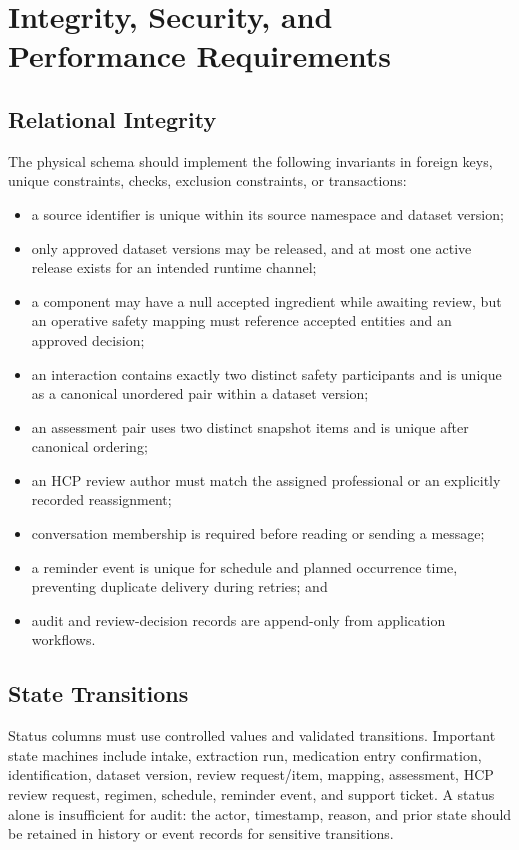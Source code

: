 \section{Integrity, Security, and Performance Requirements}

\subsection{Relational Integrity}

The physical schema should implement the following invariants in foreign keys, unique constraints, checks, exclusion constraints, or transactions:
\begin{itemize}
  \item a source identifier is unique within its source namespace and dataset version;
  \item only approved dataset versions may be released, and at most one active release exists for an intended runtime channel;
  \item a component may have a null accepted ingredient while awaiting review, but an operative safety mapping must reference accepted entities and an approved decision;
  \item an interaction contains exactly two distinct safety participants and is unique as a canonical unordered pair within a dataset version;
  \item an assessment pair uses two distinct snapshot items and is unique after canonical ordering;
  \item an HCP review author must match the assigned professional or an explicitly recorded reassignment;
  \item conversation membership is required before reading or sending a message;
  \item a reminder event is unique for schedule and planned occurrence time, preventing duplicate delivery during retries; and
  \item audit and review-decision records are append-only from application workflows.
\end{itemize}

\subsection{State Transitions}

Status columns must use controlled values and validated transitions. Important state machines include intake, extraction run, medication entry confirmation, identification, dataset version, review request/item, mapping, assessment, HCP review request, regimen, schedule, reminder event, and support ticket. A status alone is insufficient for audit: the actor, timestamp, reason, and prior state should be retained in history or event records for sensitive transitions.

